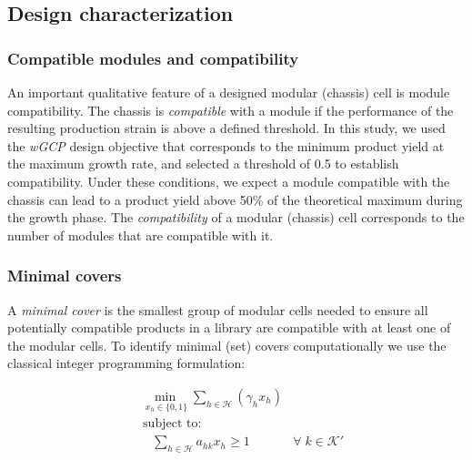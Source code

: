 \documentclass[12pt]{article}
\begin{document}
{\subsection{Design characterization} \label{sec:design_characterization}
\subsubsection{Compatible modules and compatibility}
An important qualitative feature of a designed modular (chassis) cell is module compatibility.
The chassis is \emph{compatible} with a module if the performance of the resulting production strain is above a defined threshold.
In this study, we used the \textit{wGCP} design objective that corresponds to the minimum product yield at the maximum growth rate,\citep{garcia2019} and selected a threshold of 0.5 to establish compatibility. Under these conditions, we expect a module compatible with the chassis can lead to a product yield above 50\% of the theoretical maximum during the growth phase.
The \emph{compatibility} of a modular (chassis) cell corresponds to the number of modules that are compatible with it.

\subsubsection{Minimal covers} \label{sec:minimal_covers}
A \emph{minimal cover} is the smallest group of modular cells needed to ensure all potentially compatible products in a library are compatible with at least one of the modular cells.
To identify minimal (set) covers computationally we use the classical integer programming formulation:

\begin{align}
    & \underset{ \;x_h \in \{0,1\}}{\min} \sum_{h \in \mathcal{H}} ( \gamma_h x_h) \label{eq7:mc_1}\\
    & \nonumber \; \text{subject to:} \\
    & \quad \sum_{h \in \mathcal{H}} a_{hk} x_h \ge 1 & \forall \; k \in \mathcal{K'} \label{eq7:mc_2}%
\end{align}

}
\end{document}
